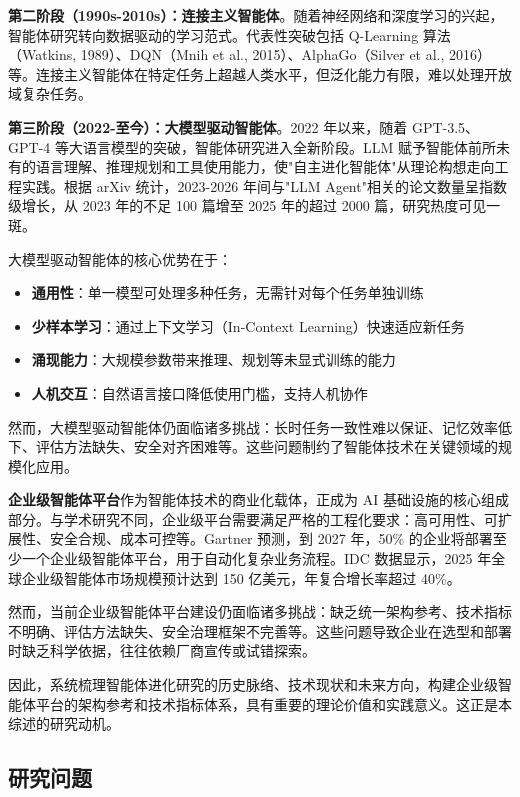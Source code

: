 \documentclass[12pt,a4paper]{article}
\begin{document}
\textbf{第二阶段（1990s-2010s）：连接主义智能体}。随着神经网络和深度学习的兴起，智能体研究转向数据驱动的学习范式。代表性突破包括 Q-Learning 算法（Watkins, 1989）、DQN（Mnih et al., 2015）、AlphaGo（Silver et al., 2016）等。连接主义智能体在特定任务上超越人类水平，但泛化能力有限，难以处理开放域复杂任务。

\textbf{第三阶段（2022-至今）：大模型驱动智能体}。2022 年以来，随着 GPT-3.5、GPT-4 等大语言模型的突破，智能体研究进入全新阶段。LLM 赋予智能体前所未有的语言理解、推理规划和工具使用能力，使"自主进化智能体"从理论构想走向工程实践。根据 arXiv 统计，2023-2026 年间与"LLM Agent"相关的论文数量呈指数级增长，从 2023 年的不足 100 篇增至 2025 年的超过 2000 篇，研究热度可见一斑。

大模型驱动智能体的核心优势在于：
\begin{itemize}
    \item \textbf{通用性}：单一模型可处理多种任务，无需针对每个任务单独训练
    \item \textbf{少样本学习}：通过上下文学习（In-Context Learning）快速适应新任务
    \item \textbf{涌现能力}：大规模参数带来推理、规划等未显式训练的能力
    \item \textbf{人机交互}：自然语言接口降低使用门槛，支持人机协作
\end{itemize}

然而，大模型驱动智能体仍面临诸多挑战：长时任务一致性难以保证、记忆效率低下、评估方法缺失、安全对齐困难等。这些问题制约了智能体技术在关键领域的规模化应用。

\textbf{企业级智能体平台}作为智能体技术的商业化载体，正成为 AI 基础设施的核心组成部分。与学术研究不同，企业级平台需要满足严格的工程化要求：高可用性、可扩展性、安全合规、成本可控等。Gartner 预测，到 2027 年，50\% 的企业将部署至少一个企业级智能体平台，用于自动化复杂业务流程。IDC 数据显示，2025 年全球企业级智能体市场规模预计达到 150 亿美元，年复合增长率超过 40\%。

然而，当前企业级智能体平台建设仍面临诸多挑战：缺乏统一架构参考、技术指标不明确、评估方法缺失、安全治理框架不完善等。这些问题导致企业在选型和部署时缺乏科学依据，往往依赖厂商宣传或试错探索。

因此，系统梳理智能体进化研究的历史脉络、技术现状和未来方向，构建企业级智能体平台的架构参考和技术指标体系，具有重要的理论价值和实践意义。这正是本综述的研究动机。

\subsection{研究问题}
\end{document}
